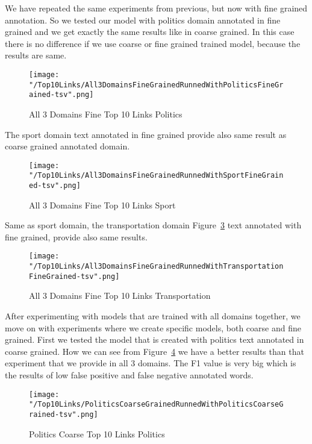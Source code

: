\documentclass[thesis=M,english]{FITthesis}[2018/05/30]
\begin{document}
	We have repeated the same experiments from previous, but now with fine grained annotation. So we tested our model with politics domain annotated in fine grained and we get exactly the same results like in coarse grained. In this case there is no difference if we use coarse or fine grained trained model, because the results are same.
	\begin{figure}[H]\centering
		\texttt{[image: "/Top10Links/All3DomainsFineGrainedRunnedWithPoliticsFineGrained-tsv".png]}
		\caption{All 3 Domains Fine Top 10 Links Politics}\label{img:all3DomainWithPoliticsFineTop10}
	\end{figure}	

	The sport domain text annotated in fine grained provide also same result as coarse grained annotated domain. 
	\begin{figure}[H]\centering
		\texttt{[image: "/Top10Links/All3DomainsFineGrainedRunnedWithSportFineGrained-tsv".png]}
		\caption{All 3 Domains Fine Top 10 Links Sport}\label{img:all3DomainWithSportFineTop10}
	\end{figure}
	
	Same as sport domain, the transportation domain Figure~\ref{img:all3DomainWithTransportationFineTop10} text annotated with fine grained, provide also same results.
	\begin{figure}[H]\centering
		\texttt{[image: "/Top10Links/All3DomainsFineGrainedRunnedWithTransportationFineGrained-tsv".png]}
		\caption{All 3 Domains Fine Top 10 Links Transportation}\label{img:all3DomainWithTransportationFineTop10}	
	\end{figure}
	
	After experimenting with models that are trained with all domains together, we move on with experiments where we create specific models, both coarse and fine grained.
	First we tested the model that is created with politics text annotated in coarse grained. How we can see from Figure~\ref{img:PoliticsWithPoliticsCoarseTop10} we have a better results than that experiment that we provide in all 3 domains. The F1 value is very big which is the results of low false positive and false negative annotated words.        
	\begin{figure}[H]\centering
		\texttt{[image: "/Top10Links/PoliticsCoarseGrainedRunnedWithPoliticsCoarseGrained-tsv".png]}
		\caption{Politics Coarse Top 10 Links Politics}\label{img:PoliticsWithPoliticsCoarseTop10}
	\end{figure}	
\end{document}
